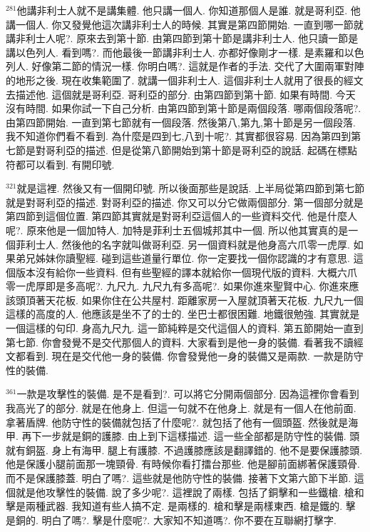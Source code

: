 \documentclass{book}
\begin{document}
$^{281}$他講非利士人就不是講集體.
他只講一個人.
你知道那個人是誰.
就是哥利亞.
他講一個人.
你又發覺他這次講非利士人的時候.
其實是第四節開始.
一直到哪一節就講非利士人呢?.
原來去到第十節.
由第四節到第十節是講非利士人.
他只讀一節是講以色列人.
看到嗎?.
而他最後一節講非利士人.
亦都好像剛才一樣.
是素羅和以色列人.
好像第二節的情況一樣.
你明白嗎?.
這就是作者的手法.
交代了大圍兩軍對陣的地形之後.
現在收集範圍了.
就講一個非利士人.
這個非利士人就用了很長的經文去描述他.
這個就是哥利亞.
哥利亞的部分.
由第四節到第十節.
如果有時間.
今天沒有時間.
如果你試一下自己分析.
由第四節到第十節是兩個段落.
哪兩個段落呢?.
由第四節開始.
一直到第七節就有一個段落.
然後第八,第九,第十節是另一個段落.
我不知道你們看不看到.
為什麼是四到七,八到十呢?.
其實都很容易.
因為第四到第七節是對哥利亞的描述.
但是從第八節開始到第十節是哥利亞的說話.
起碼在標點符都可以看到.
有開印號.

$^{321}$就是這裡.
然後又有一個開印號.
所以後面那些是說話.
上半局從第四節到第七節就是對哥利亞的描述.
對哥利亞的描述.
你又可以分它做兩個部分.
第一個部分就是第四節到這個位置.
第四節其實就是對哥利亞這個人的一些資料交代.
他是什麼人呢?.
原來他是一個加特人.
加特是菲利士五個城邦其中一個.
所以他其實真的是一個菲利士人.
然後他的名字就叫做哥利亞.
另一個資料就是他身高六爪零一虎厚.
如果弟兄姊妹你讀聖經.
碰到這些道量行單位.
你一定要找一個你認識的才有意思.
這個版本沒有給你一些資料.
但有些聖經的譯本就給你一個現代版的資料.
大概六爪零一虎厚即是多高呢?.
九尺九.
九尺九有多高呢?.
如果你進來聖賢中心.
你進來應該頭頂著天花板.
如果你住在公共屋村.
距離家房一入屋就頂著天花板.
九尺九一個這樣的高度的人.
他應該是坐不了的士的.
坐巴士都很困難.
地鐵很勉強.
其實就是一個這樣的句印.
身高九尺九.
這一節純粹是交代這個人的資料.
第五節開始一直到第七節.
你會發覺不是交代那個人的資料.
大家看到是他一身的裝備.
看著我不讀經文都看到.
現在是交代他一身的裝備.
你會發覺他一身的裝備又是兩款.
一款是防守性的裝備.

$^{361}$一款是攻擊性的裝備.
是不是看到?.
可以將它分開兩個部分.
因為這裡你會看到我高光了的部分.
就是在他身上.
但這一句就不在他身上.
就是有一個人在他前面.
拿著盾牌.
他防守性的裝備就包括了什麼呢?.
就包括了他有一個頭盔.
然後就是海甲.
再下一步就是銅的護膝.
由上到下這樣描述.
這一些全部都是防守性的裝備.
頭就有銅盔.
身上有海甲.
腿上有護膝.
不過護膝應該是翻譯錯的.
他不是要保護膝頭.
他是保護小腿前面那一塊頸骨.
有時候你看打擂台那些.
他是腳前面綁著保護頸骨.
而不是保護膝蓋.
明白了嗎?.
這些就是他防守性的裝備.
接著下文第六節下半節.
這個就是他攻擊性的裝備.
說了多少呢?.
這裡說了兩樣.
包括了銅擊和一些鐵槍.
槍和擊是兩種武器.
我知道有些人搞不定.
是兩樣的.
槍和擊是兩樣東西.
槍是鐵的.
擊是銅的.
明白了嗎?.
擊是什麼呢?.
大家知不知道嗎?.
你不要在互聯網打擊字.
\end{document}
